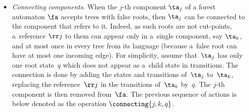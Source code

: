 \begin{itemize}
%

\item \emph{Connecting components.}
When the $j$-th component $\ta_j$ of a forest automaton $\fa$ accepts trees with false roots, 
then $\ta_j$ can be connected to the component that refers to it. 
%
Indeed, as such roots are not cut-points, 
a~reference $\rr j$ to them can appear only in a~single component, say $\ta_k$, 
and at most once in every tree from its language (because a~false root
can have at most one incoming edge). 
%
For simplicity, assume that~$\ta_j$ has only one root state~$q$ which does
not appear as a~child state in transitions.
%
The connection is done by adding the states and transitions of~$\ta_j$ to~$\ta_k$,
replacing the reference~$\rr j$ in the transitions of~$\ta_k$ by~$q$.
%
The $j$-th component is then removed from~$\fa$.
%
The previous sequence of actions is below denoted as the operation $\connecting{j,k,q}$. 
%
%

\end{itemize}

